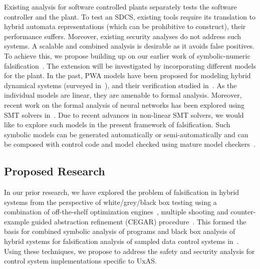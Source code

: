 Existing analysis for software controlled plants separately tests the
software controller and the plant. To test an SDCS, existing tools
require its translation to hybrid automata representations (which can
be prohibitive to construct), their performance suffers.  Moreover,
existing security analyses do not address such systems. A scalable and
combined analysis is desirable as it avoids false positives. To
achieve this, we propose building up on our earlier work of
symbolic-numeric falsification~\cite{zutshi2016symbolic}. The
extension will be investigated by incorporating different models for
the plant. In the past, PWA models have been proposed for modeling
hybrid dynamical systems (surveyed
in~\cite{paoletti2007identification}), and their verification studied
in~\cite{yordanov2007model, yordanov2010formal, koutsoukos2003safety,
batt2007model}. As the individual models are linear, they are amenable
to formal analysis.  Moreover, recent work on the formal analysis of
neural networks has been explored using SMT solvers
in~\cite{pulina2012challenging, pulina2011never, pulina2011checking,
katz2017reluplex}. Due to recent advances in non-linear SMT solvers,
we would like to explore such models in the present framework of
falsification. Such symbolic models can be generated automatically or
semi-automatically and can be composed with control code and model
checked using mature model checkers~\cite{kroening2014cbmc}.


\subsection{Proposed Research}

In our prior research, we have explored the problem of falsification
in hybrid systems from the perspective of white/grey/black box testing
using a combination of off-the-shelf optimization
engines~\cite{Zutshi+Others/2013/Trajectory}, multiple shooting and
counter-example guided abstraction refinement (CEGAR)
procedure~\cite{zutshi2014multiple}. This formed the basis for
combined symbolic analysis of programs and black box analysis of
hybrid systems for falsification analysis of sampled data control
systems in~\cite{zutshi2016symbolic}.  Using these techniques, we
propose to address the safety and security analysis for control system
implementations specific to UxAS.

